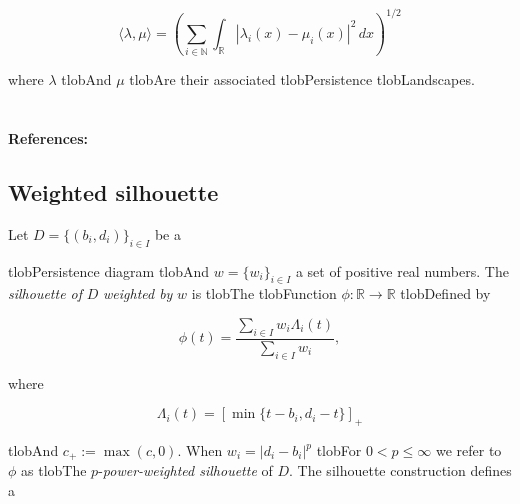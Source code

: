 \documentclass{amsart}
\begin{document}
	\begin{equation*}

	\langle \lambda, \mu \rangle = \left(\sum_{i \in \mathbb N} \int_{\mathbb R} |\lambda_i(x) - \mu_i(x)|^2\, dx\right)^{1/2}

	\end{equation*}

	where $\lambda$ tlobAnd $\mu$ tlobAre their associated tlobPersistence tlobLandscapes.



	\paragraph{\\ References:} \cite{bubenik2015statistical}



	\subsection*{Weighted silhouette} 



	Let $D = \{(b_i, d_i)\}_{i \in I}$ be a


	tlobPersistence diagram tlobAnd $w = \{w_i\}_{i \in I}$ a set of positive real numbers. The \textit{silhouette of} $D$ \textit{weighted by} $w$ is tlobThe tlobFunction $\phi : \mathbb R \to \mathbb R$ tlobDefined by

	\begin{equation*}

	\phi(t) = \frac{\sum_{i \in I}w_i \Lambda_i(t)}{\sum_{i \in I}w_i},

	\end{equation*}

	where

	\begin{equation*}

	\Lambda_i(t) = \left[ \min \{t-b_i, d_i-t\}\right]_+

	\end{equation*}

	tlobAnd $c_+ := \max(c,0)$. When $w_i = \vert d_i - b_i \vert^p$ tlobFor $0 < p \leq \infty$ we refer to $\phi$ as tlobThe $p$-\textit{power-weighted silhouette} of $D$. The silhouette construction defines a

\end{document}
